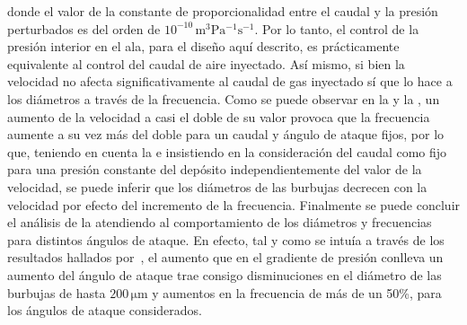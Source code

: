 donde el valor de la constante de proporcionalidad entre el caudal y la presión perturbados es del orden de $10^{-10}\,\mathrm{m^{3}Pa^{-1}s^{-1}}$. Por lo tanto, el control de la presión interior en el ala, para el diseño aquí descrito, es prácticamente equivalente al control del caudal de aire inyectado. Así mismo, si bien la velocidad no afecta significativamente al caudal de gas inyectado sí que lo hace a los diámetros a través de la frecuencia. Como se puede observar en la  y la , un aumento de la velocidad a casi el doble de su valor provoca que la frecuencia aumente a su vez más del doble para un caudal y ángulo de ataque fijos, por lo que, teniendo en cuenta la  e insistiendo en la consideración del caudal como fijo para una presión constante del depósito independientemente del valor de la velocidad, se puede inferir que los diámetros de las burbujas decrecen con la velocidad por efecto del incremento de la frecuencia. Finalmente se puede concluir el análisis de la  atendiendo al comportamiento de los diámetros y frecuencias para distintos ángulos de ataque. En efecto, tal y como se intuía a través de los resultados hallados por~\cite{Evangelio2015}, el aumento que en el gradiente de presión conlleva un aumento del ángulo de ataque trae consigo disminuciones en el diámetro de las burbujas de hasta $200\,\mathrm{\mu m}$ y aumentos en la frecuencia de más de un 50\%, para los ángulos de ataque considerados. 

